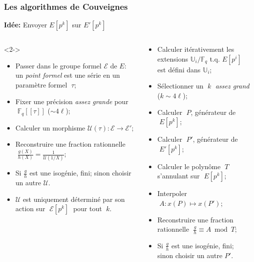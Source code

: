 \documentclass[10pt]{beamer}
\newcommand{\U}{\mathbb{U}}  %
\newcommand{\F}{\mathbb{F}}  %
\newcommand{\0}{\mathcal{O}}  %
\begin{document}

{
\begin{frame}
  \frametitle{Les algorithmes de Couveignes}
  
  \begin{center}
    \textbf{Idée:} Envoyer $E[p^k]$ sur $E'[p^k]$
  \end{center}

  \begin{columns}[t]
    \begin{column}{0.5\textwidth}
      \centering\cite{couveignes94}

      \begin{uncoverenv}<2-> 
        \begin{itemize}
        \item Passer dans le groupe formel $\mathcal{E}$ de $E$: un
          \emph{point formel} est une série en un paramètre formel
          $\;\tau$;
        \item Fixer une précision \emph{assez grande} pour
          $\;\F_q[[\tau]]$ ($\sim 4\ell$);
        \item Calculer un morphisme $\mathcal{U}(\tau) : \mathcal{E}
          \to \mathcal{E}'$;
        \item Reconstruire une fraction rationnelle
          $\;\frac{g(X)}{h(X)} = \frac{1}{\mathcal{U}(1/X)}$;
        \item Si $\frac{g}{h}$ est une isogénie, fini; sinon choisir
          un autre $\mathcal{U}$.
        \item<3> $\mathcal{U}$ est uniquement déterminé par son action
          sur $\;\mathcal{E}[p^k]\;$ pour tout $\;k$.
        \end{itemize}
      \end{uncoverenv}
    \end{column}
    \begin{column}{0.5\textwidth}
      \centering\cite{couveignes96}
      
      \begin{itemize}
      \item Calculer itérativement les extensions $\U_i/\F_q$
        t.q. $E[p^i]$ est défini dans $\U_i$;
      \item Sélectionner un $\;k\;$ \emph{assez grand} ($k\sim 4\ell$);
      \item Calculer $\;P$, générateur de $\;E[p^k]$;
      \item Calculer $\;P'$, générateur de $\;E'[p^k]$;
      \item Calculer le polynôme $\;T\;$ s'annulant sur $\;E[p^k]$;
      \item Interpoler $\;A : x(P) \mapsto x(P')$;
      \item Reconstruire une fraction rationnelle $\;\frac{g}{h}\equiv A \bmod T$;
      \item Si $\frac{g}{h}$ est une isogénie, fini; sinon choisir un autre $P'$.
      \end{itemize}
    \end{column}
  \end{columns}
\end{frame}
}
\end{document}
